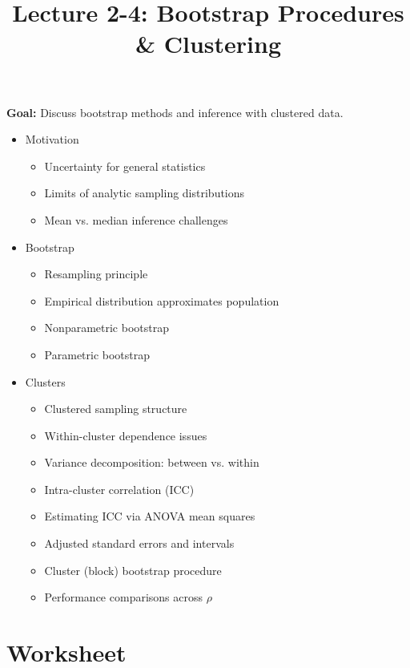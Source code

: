 \documentclass[12pt]{article}
\title{\Large Lecture 2-4: Bootstrap Procedures \& Clustering}
\author{}
\date{}
\begin{document}
\maketitle
\vspace{-6em}

\noindent \textbf{Goal:} Discuss bootstrap methods and inference with clustered data.\medskip

\begin{itemize}\setlength{\itemsep}{1em}
\item Motivation
\begin{itemize}
\item Uncertainty for general statistics
\item Limits of analytic sampling distributions
\item Mean vs. median inference challenges
\end{itemize}
\item Bootstrap
\begin{itemize}
\item Resampling principle
\item Empirical distribution approximates population
\item Nonparametric bootstrap
\item Parametric bootstrap
\end{itemize}
\item Clusters
\begin{itemize}
\item Clustered sampling structure
\item Within-cluster dependence issues
\item Variance decomposition: between vs. within
\item Intra-cluster correlation (ICC)
\item Estimating ICC via ANOVA mean squares
\item Adjusted standard errors and intervals
\item Cluster (block) bootstrap procedure
\item Performance comparisons across $\rho$
\end{itemize}
\end{itemize}


\clearpage


\section*{Worksheet}
\end{document}
